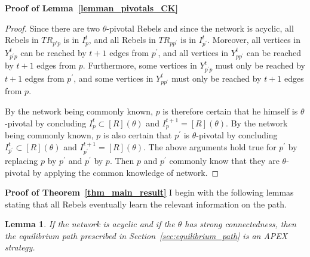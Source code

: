 \documentclass[12pt,letter]{article}
\newtheorem{lemma}{Lemma}[section]
\newtheorem*{lemma*}{Lemma}
\theoremstyle{definition}
\theoremstyle{remark}
\theoremstyle{claim}
\begin{document}
\bigskip
\noindent\textbf{Proof of Lemma~\ref{lemman_pivotals_CK}}
\begin{proof}
Since there are two $\theta$-pivotal Rebels and since the network is acyclic, all Rebels in $TR_{p{'}p}$ is in $I^t_{p}$, and all Rebels in $TR_{pp^{'}}$ is in $I^t_{p^{'}}$. Moreover, all vertices in $Y^t_{p^{'}p}$ can be reached by $t+1$ edges from $p^{'}$, and all vertices in $Y^t_{pp^{'}}$ can be reached by $t+1$ edges from $p$. Furthermore, some vertices in $Y^t_{p^{'}p}$ must only be reached by $t+1$ edges from $p^{'}$, and some vertices in $Y^t_{pp^{'}}$ must only be reached by $t+1$ edges from $p$. 

By the network being commonly known, $p$ is therefore certain that he himself is $\theta$-pivotal by concluding $I^t_{p}\subset [R](\theta)$ and $I^{t+1}_{p}=[R](\theta)$. By the network being commonly known, $p$ is also certain that $p^{'}$ is $\theta$-pivotal by concluding $I^t_{p^{'}}\subset [R](\theta)$ and $I^{t+1}_{p^{'}}=[R](\theta)$. The above arguments hold true for $p^{'}$ by replacing $p$ by $p^{'}$ and $p^{'}$ by $p$. Then $p$ and $p^{'}$ commonly know that they are $\theta$-pivotal by applying the common knowledge of network.
\end{proof}
\bigskip
\noindent\textbf{Proof of Theorem~\ref{thm_main_result}}
I begin with the following lemmas stating that all Rebels eventually learn the relevant information on the path.
\begin{lemma}
\label{lemma:learning_on_the_path}
If the network is acyclic and if the $\theta$ has strong connectedness, then the equilibrium path prescribed in Section~\ref{sec:equilibrium_path} is an APEX strategy.
\end{lemma}
\end{document}
